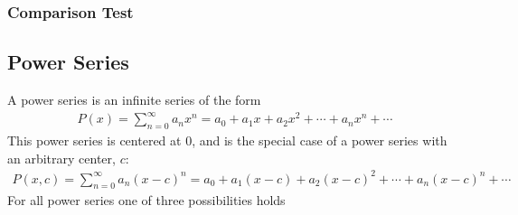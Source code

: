     \subsubsection{Comparison Test}
  \subsection{Power Series}
    A power series is an infinite series of the form
    \begin{align*}
      P(x) = \sum_{n=0}^{\infty} a_nx^n = a_0 + a_1x + a_2x^2 + \cdots + a_nx^n + \cdots
    \end{align*}
    This power series is centered at 0, and is the special case of a power series with an
    arbitrary center, $c$:
    \begin{align*}
      P(x,c) = \sum_{n=0}^{\infty} a_n(x-c)^n = a_0 + a_1(x-c) + a_2(x-c)^2 + \cdots + 
                                                                            a_n(x-c)^n + \cdots
    \end{align*}
    For all power series one of three possibilities holds
